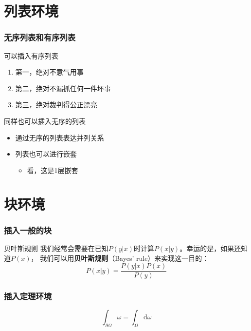 \documentclass[aspectratio=169]{mybeamer}
\begin{document}
	\section{列表环境}
	\begin{frame}
		\frametitle{无序列表和有序列表}
		可以插入有序列表
		\begin{enumerate}
			\item 第一，绝对不意气用事
			\item 第二，绝对不漏抓任何一件坏事
			\item 第三，绝对裁判得公正漂亮
		\end{enumerate}
		同样也可以插入无序的列表
		\begin{itemize}
			\item 通过无序的列表表达并列关系
			\item 列表也可以进行嵌套
			\begin{itemize}
				\item 看，这是1层嵌套
			\end{itemize}
		\end{itemize}
	\end{frame}

	\section{块环境}
	\begin{frame}
		\frametitle{插入一般的块}
		\begin{block}{贝叶斯规则}
			我们经常会需要在已知$P(y|x)$时计算$P(x|y)$。幸运的是，如果还知道$P(x)$，
			我们可以用\textbf{贝叶斯规则}（Bayes’ rule）来实现这一目的：
			$$
			P(x|y) = \frac{P(y|x) P(x)}{P(y)}
			$$
		\end{block}
	\end{frame}
	\begin{frame}
		\frametitle{插入定理环境}
		\begin{theorem}[Stokes定理]
			$$
			\int_{\partial \Omega} \omega = \int_{\Omega} \mathrm{d} \omega	
			$$
		\end{theorem}
	\end{frame}
\end{document}
